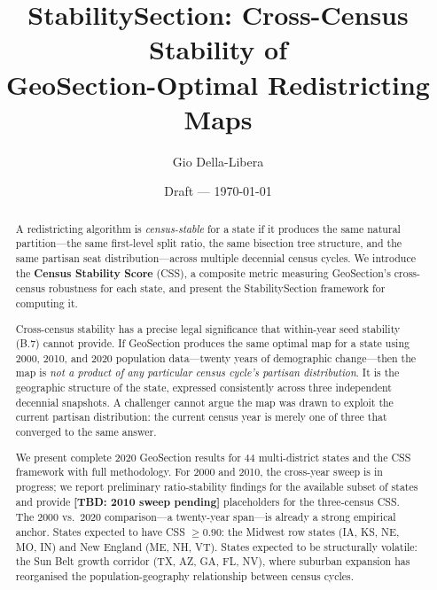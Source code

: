 \documentclass[12pt]{article}
\title{StabilitySection: Cross-Census Stability of\\
       GeoSection-Optimal Redistricting Maps}
\author{Gio Della-Libera}
\date{Draft --- \today}
\begin{document}
\maketitle

\begin{abstract}
A redistricting algorithm is \emph{census-stable} for a state if it produces
the same natural partition---the same first-level split ratio, the same
bisection tree structure, and the same partisan seat distribution---across
multiple decennial census cycles.
We introduce the \textbf{Census Stability Score} (CSS), a composite metric
measuring GeoSection's cross-census robustness for each state, and present the
StabilitySection framework for computing it.

Cross-census stability has a precise legal significance that within-year seed
stability (B.7) cannot provide.
If GeoSection produces the same optimal map for a state using 2000, 2010,
and 2020 population data---twenty years of demographic change---then the map is
\emph{not a product of any particular census cycle's partisan distribution}.
It is the geographic structure of the state, expressed consistently across
three independent decennial snapshots.
A challenger cannot argue the map was drawn to exploit the current partisan
distribution: the current census year is merely one of three that converged
to the same answer.

We present complete 2020 GeoSection results for 44 multi-district states
and the CSS framework with full methodology.
For 2000 and 2010, the cross-year sweep is in progress; we report
preliminary ratio-stability findings for the available subset of states and
provide \textbf{[TBD: 2010 sweep pending]} placeholders for the
three-census CSS.
The 2000 vs.\ 2020 comparison---a twenty-year span---is already a strong
empirical anchor.
States expected to have CSS $\geq 0.90$: the Midwest row states (IA, KS, NE,
MO, IN) and New England (ME, NH, VT).
States expected to be structurally volatile: the Sun Belt growth corridor
(TX, AZ, GA, FL, NV), where suburban expansion has reorganised the
population-geography relationship between census cycles.
\end{abstract}










\end{document}
